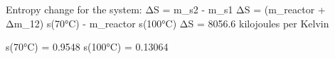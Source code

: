 Entropy change for the system:  
ΔS = m_s2 - m_s1  
ΔS = (m_reactor + Δm_12) s(70°C) - m_reactor s(100°C)  
ΔS = 8056.6 kilojoules per Kelvin  

s(70°C) = 0.9548  
s(100°C) = 0.13064